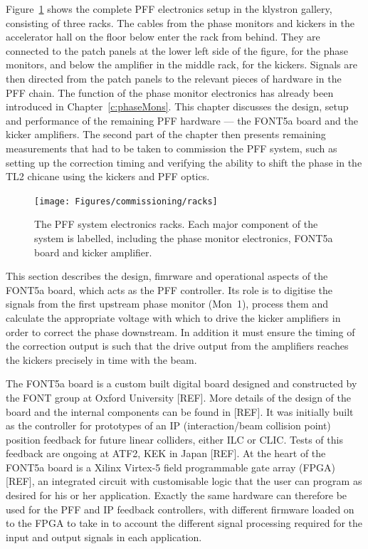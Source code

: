 
Figure~\ref{f:racks} shows the complete PFF electronics setup in the klystron gallery, consisting of three racks. The cables from the phase monitors and kickers in the accelerator hall on the floor below enter the rack from behind. They are connected to the patch panels at the lower left side of the figure, for the phase monitors, and below the amplifier in the middle rack, for the kickers. Signals are then directed from the patch panels to the relevant pieces of hardware in the PFF chain. The function of the phase monitor electronics has already been introduced in Chapter~\ref{c:phaseMons}. This chapter discusses the design, setup and performance of the remaining PFF hardware --- the FONT5a board and the kicker amplifiers. The second part of the chapter then presents remaining measurements that had to be taken to commission the PFF system, such as setting up the correction timing and verifying the ability to shift the phase in the TL2 chicane using the kickers and PFF optics.

\begin{figure}
  \centering
  \texttt{[image: Figures/commissioning/racks]}
  \caption{The PFF system electronics racks. Each major component of the system is labelled, including the phase monitor electronics, FONT5a board and kicker amplifier.}
  \label{f:racks}
\end{figure}


This section describes the design, fimrware and operational aspects of the FONT5a board, which acts as the PFF controller. Its role is to digitise the signals from the first upstream phase monitor (Mon~1), process them and calculate the appropriate voltage with which to drive the kicker amplifiers in order to correct the phase downstream. In addition it must ensure the timing of the correction output is such that the drive output from the amplifiers reaches the kickers precisely in time with the beam.

The FONT5a board is a custom built digital board designed and constructed by the FONT group at Oxford University [REF]. More details of the design of the board and the internal components can be found in [REF]. It was initially built as the controller for prototypes of an IP (interaction/beam collision point) position feedback for future linear colliders, either ILC or CLIC. Tests of this feedback are ongoing at ATF2, KEK in Japan  [REF]. At the heart of the FONT5a board is a Xilinx Virtex-5 field programmable gate array (FPGA) [REF], an integrated circuit with customisable logic that the user can program as desired for his or her application. Exactly the same hardware can therefore be used for the PFF and IP feedback controllers, with different firmware loaded on to the FPGA to take in to account the different signal processing required for the input and output signals in each application.

